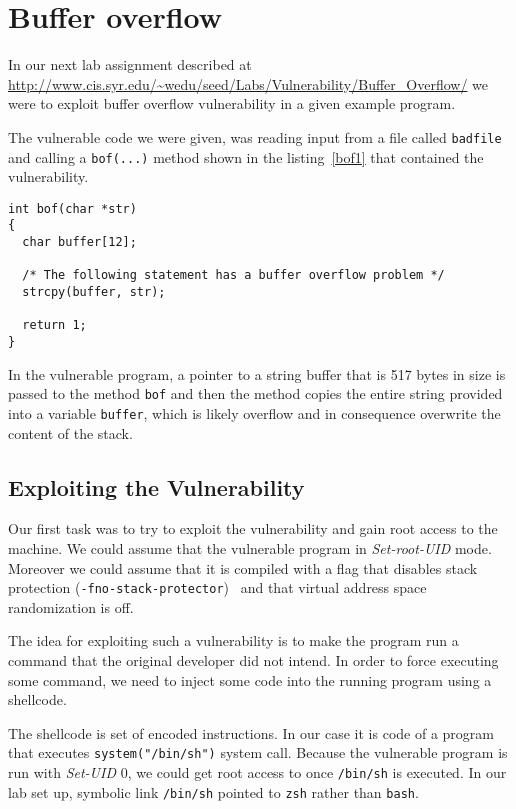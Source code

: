 \documentclass[12pt, a4paper, pdflatex]{article}
\begin{document}
\section{Buffer overflow\label{sec:buffover}}

In our next lab assignment described at \url{http://www.cis.syr.edu/~wedu/seed/Labs/Vulnerability/Buffer_Overflow/} we were to exploit buffer overflow vulnerability in a given example program.

The vulnerable code we were given, was reading input from a file called \texttt{badfile} and calling a \texttt{bof(...)} method shown in the listing~\ref{bof1} that contained the vulnerability.

\vspace{1em}
\lstset{
	captionpos=b,
	frame=single,
	language=C,
	breaklines=true,
	caption=Function with buffer overflow vulnerability,
	label=bof1,
  float=tb
}
\begin{lstlisting}
int bof(char *str)
{
  char buffer[12];

  /* The following statement has a buffer overflow problem */ 
  strcpy(buffer, str);

  return 1;
}
\end{lstlisting}
In the vulnerable program, a pointer to a string buffer that is 517 bytes in size is passed to the method \texttt{bof} and then the method copies the entire string provided into a variable \texttt{buffer}, which is likely overflow and in consequence overwrite the content of the stack.

\subsection{Exploiting the Vulnerability}

Our first task was to try to exploit the vulnerability and gain root access to the machine. We could assume that the vulnerable program in \emph{Set-root-UID} mode. Moreover we could assume that it is compiled with a flag that disables stack protection (\texttt{-fno-stack-protector})~\cite{gnu13} and that virtual address space randomization is off.

The idea for exploiting such a vulnerability is to make the program run a command that the original developer did not intend. In order to force executing some command, we need to inject some code into the running program using a shellcode. 

The shellcode is set of encoded instructions. In our case it is code of a program that executes \texttt{system("/bin/sh")} system call. Because the vulnerable program is run with \emph{Set-UID} 0, we could get root access to once \texttt{/bin/sh} is executed. In our lab set up, symbolic link \texttt{/bin/sh} pointed to \texttt{zsh} rather than \texttt{bash}.
\end{document}
